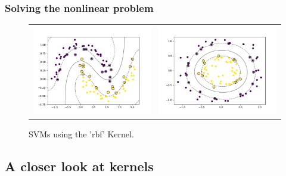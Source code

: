 \documentclass{beamer}
\begin{document}
\begin{frame}{}
	\frametitle{Solving the nonlinear problem}
	\begin{figure}[h]
		\begin{tabular}{ll}
			\includegraphics[scale=0.35]{img/rbfSVM_moon.png}
			&
			\includegraphics[scale=0.35]{img/rbfSVM_circles.png}
		\end{tabular}
		\caption{SVMs using the 'rbf' Kernel.}
		\label{Fig:rbfsvms}
	\end{figure}
\end{frame}


\subsection{A closer look at kernels}
\end{document}
